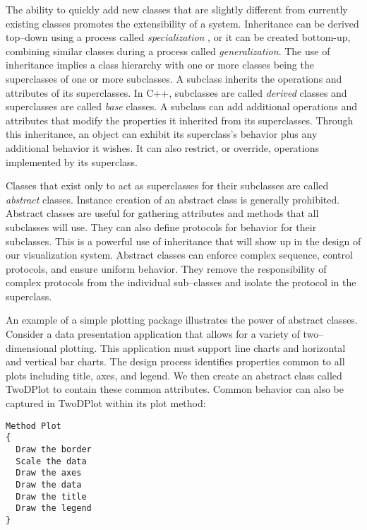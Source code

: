 The ability to quickly add new classes that are slightly different from currently existing classes promotes the extensibility of a system. Inheritance can be derived top--down using a process called \emph{specialization} , or it can be created bottom-up, combining similar classes during a process called \emph{generalization}. The use of inheritance implies a class hierarchy with one or more classes being the superclasses of one or more subclasses. A subclass inherits the operations and attributes of its superclasses. In C++, subclasses are called \emph{derived} classes and superclasses are called \emph{base} classes. A subclass can add additional operations and attributes that modify the properties it inherited from its superclasses. Through this inheritance, an object can exhibit its superclass's behavior plus any additional behavior it wishes. It can also restrict, or override, operations implemented by its superclass.

Classes that exist only to act as superclasses for their subclasses are called \emph{abstract} classes. Instance creation of an abstract class is generally prohibited. Abstract classes are useful for gathering attributes and methods that all subclasses will use. They can also define protocols for behavior for their subclasses. This is a powerful use of inheritance that will show up in the design of our visualization system. Abstract classes can enforce complex sequence, control protocols, and ensure uniform behavior. They remove the responsibility of complex protocols from the individual sub--classes and isolate the protocol in the superclass.

An example of a simple plotting package illustrates the power of abstract classes. Consider a data presentation application that allows for a variety of two--dimensional plotting. This application must support line charts and horizontal and vertical bar charts. The design process identifies properties common to all plots including title, axes, and legend. We then create an abstract class called TwoDPlot to contain these common attributes. Common behavior can also be captured in TwoDPlot within its plot method:

\begin{lstlisting}[caption={TwoDPlot.}]
Method Plot
{
  Draw the border
  Scale the data
  Draw the axes
  Draw the data
  Draw the title
  Draw the legend
}
\end{lstlisting}

